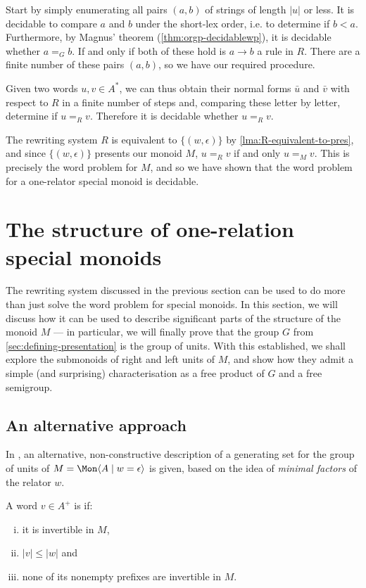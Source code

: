 \documentclass[noindex,noinsetproof,emphthm,12pt]{lmaths}
\begin{document}
Start by simply enumerating all pairs $(a, b)$ of strings of length $|u|$ or less. It is decidable to compare $a$ and $b$ under the short-lex order, i.e. to determine if $b < a$. Furthermore, by Magnus' theorem (\cref{thm:orgp-decidablewp}), it is decidable whether $a =_G b$. If and only if both of these hold is $a \to b$ a rule in $R$. There are a finite number of these pairs $(a, b)$, so we have our required procedure.

Given two words $u, v \in A^*$, we can thus obtain their normal forms $\bar u$ and $\bar v$ with respect to $R$ in a finite number of steps and, comparing these letter by letter, determine if $u =_R v$. Therefore it is decidable whether $u =_R v$.

The rewriting system $R$ is equivalent to $\{(w, \epsilon)\}$ by \cref{lma:R-equivalent-to-pres}, and since $\{(w, \epsilon)\}$ presents our monoid $M$, $u =_R v$ if and only $u =_M v$. This is precisely the word problem for $M$, and so we have shown that the word problem for a one-relator special monoid is decidable.


\section{The structure of one-relation special monoids} \label{sec:structure}

The rewriting system discussed in the previous section can be used to do more than just solve the word problem for special monoids. In this section, we will discuss how it can be used to describe significant parts of the structure of the monoid $M$ --- in particular, we will finally prove that the group $G$ from \cref{sec:defining-presentation} is the group of units. With this established, we shall explore the submonoids of right and left units of $M$, and show how they admit a simple (and surprising) characterisation as a free product of $G$ and a free semigroup.

\subsection{An alternative approach}

In \cite{Zhang1992}, an alternative, non-constructive description of a generating set for the group of units of $M = \Mon \langle A \mid w = \epsilon\rangle$ is given, based on the idea of \emph{minimal factors} of the relator $w$.

\begin{defn}
	A word $v \in A^+$ is  if:
	\begin{enumerate}[(i)]
		\item it is invertible in $M$,
		\item $|v| \le |w|$ and
		\item none of its nonempty prefixes are invertible in $M$.
	\end{enumerate}
\end{defn}
\end{document}
